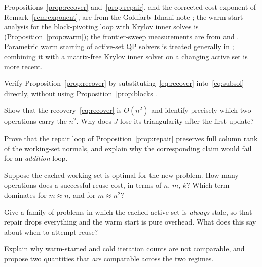 \begin{notes}
Propositions~\ref{prop:recover} and~\ref{prop:repair}, and the corrected cost exponent
of Remark~\ref{rem:exponent}, are from the Goldfarb--Idnani note \cite{schmelzer2026quadprog}; the warm-start analysis for
the block-pivoting loop with Krylov inner solves is \cite{schmelzer2026nncg}
(Proposition~\ref{prop:warm}); the frontier-sweep measurements are from
\cite{schmelzer2026rmt} and \cite{schmelzer2026matrixfree}. Parametric warm starting of
active-set QP solvers is treated generally in \cite{nocedal2006}; combining it with a
matrix-free Krylov inner solver on a changing active set is more recent.
\end{notes}

\begin{exercises}

\begin{exercise}
Verify Proposition~\ref{prop:recover} by substituting~\eqref{eq:recover}
into~\eqref{eq:subsol} directly, without using Proposition~\ref{prop:blocks}.
\end{exercise}

\begin{exercise}
Show that the recovery~\eqref{eq:recover} is $O(n^2)$ and identify precisely which two
operations carry the $n^2$. Why does $J$ lose its triangularity after the first update?
\end{exercise}

\begin{exercise}
Prove that the repair loop of Proposition~\ref{prop:repair} preserves full column rank
of the working-set normals, and explain why the corresponding claim would fail for an
\emph{addition} loop.
\end{exercise}

\begin{exercise}
Suppose the cached working set is optimal for the new problem. How many operations does
a successful reuse cost, in terms of $n$, $m$, $k$? Which term dominates for
$m \approx n$, and for $m \approx n^2$?
\end{exercise}

\begin{exercise}
Give a family of problems in which the cached active set is \emph{always} stale, so that
repair drops everything and the warm start is pure overhead. What does this say about
when to attempt reuse?
\end{exercise}

\begin{exercise}
Explain why warm-started and cold iteration counts are not comparable, and propose two
quantities that \emph{are} comparable across the two regimes.
\end{exercise}


\end{exercises}
